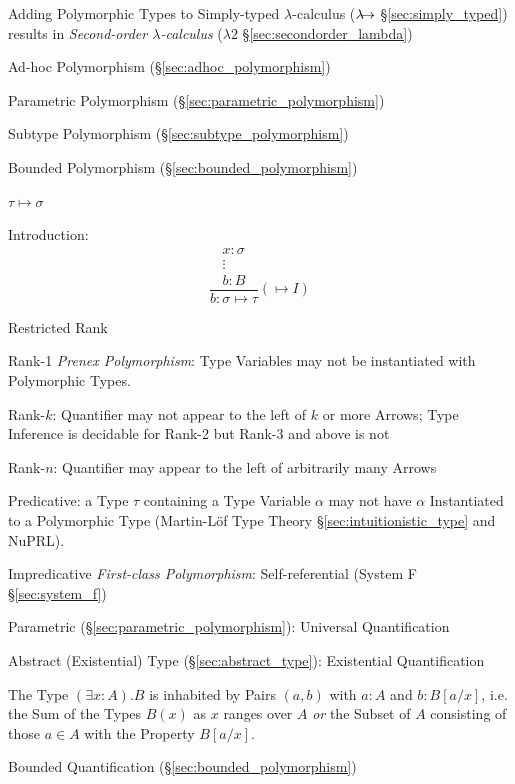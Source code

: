 Adding Polymorphic Types to Simply-typed $\lambda$-calculus
($\lambda\kern-5pt\rightarrow$ \S\ref{sec:simply_typed}) results in
\emph{Second-order $\lambda$-calculus} ($\lambda2$
\S\ref{sec:secondorder_lambda})


Ad-hoc Polymorphism (\S\ref{sec:adhoc_polymorphism})

Parametric Polymorphism (\S\ref{sec:parametric_polymorphism})

Subtype Polymorphism (\S\ref{sec:subtype_polymorphism})

Bounded Polymorphism (\S\ref{sec:bounded_polymorphism})


\asterism


$\tau \mapsto \sigma$

Introduction:
\[
  {
  \frac{
    \begin{matrix}
      x : \sigma \\
      \vdots \\
      b : B
    \end{matrix}
  }
  {b : \sigma \mapsto \tau}
  }(\mapsto I)
\]


\asterism


Restricted Rank

Rank-1 \emph{Prenex Polymorphism}: Type Variables may not be
instantiated with Polymorphic Types.

Rank-$k$: Quantifier may not appear to the left of $k$ or more Arrows;
Type Inference is decidable for Rank-2 but Rank-3 and above is not

Rank-$n$: Quantifier may appear to the left of arbitrarily many Arrows

Predicative: a Type $\tau$ containing a Type Variable $\alpha$ may not
have $\alpha$ Instantiated to a Polymorphic Type (Martin-L\"of Type
Theory \S\ref{sec:intuitionistic_type} and NuPRL).

Impredicative \emph{First-class Polymorphism}: Self-referential
(System F \S\ref{sec:system_f})

Parametric (\S\ref{sec:parametric_polymorphism}): Universal
Quantification

Abstract (Existential) Type (\S\ref{sec:abstract_type}): Existential
Quantification

The Type $(\exists x : A).B$ is inhabited by Pairs $(a,b)$ with $a:A$
and $b:B[a/x]$, i.e. the Sum of the Types $B(x)$ as $x$ ranges over
$A$ \emph{or} the Subset of $A$ consisting of those $a \in A$ with the
Property $B[a/x]$.

Bounded Quantification (\S\ref{sec:bounded_polymorphism})

